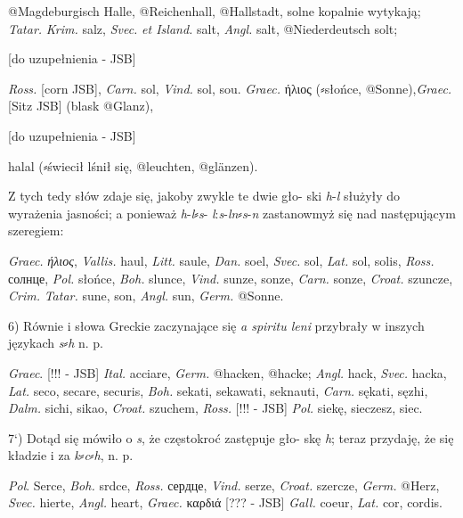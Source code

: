 



@{Magdeburgisch Halle}, @{Reichenhall}, @{Hallstadt}, solne kopalnie wytykają;
\textit{Tatar.} \textit{Krim.} salz, \textit{Svec.} \textit{et Island.} salt, \textit{Angl.} salt, @{Niederdeutsch solt};

[do uzupełnienia - JSB]

\textit{Ross.} [corn JSB], \textit{Carn.} sol, \textit{Vind.} sol, sou.
\textit{Graec.} ήλιος (⸗słońce, @{Sonne}),\textit{Graec.} [Sitz JSB] (blask  @{Glanz}),

[do uzupełnienia - JSB]


halal (⸗świecił lśnił się, @{leuchten}, @{glänzen}).

Z tych tedy słów zdaje się, jakoby zwykle te dwie gło-
ski \textit{h}-\textit{l} służyły do wyrażenia jasności; a ponieważ \textit{h}-\textit{l}⸗\textit{s}-
\textit{l}:\textit{s}-\textit{ln}⸗\textit{s}-\textit{n} zastanowmyż się nad następującym szeregiem:

\textit{Graec.} \textit{ήλιος}, \textit{Vallis.} haul, \textit{Litt.} saule, \textit{Dan.} soel, \textit{Svec.} sol, \textit{Lat.} sol, solis, \textit{Ross.} солнце, \textit{Pol.} słońce, \textit{Boh.} slunce,
\textit{Vind.} sunze, sonze, \textit{Carn.} sonze, \textit{Croat.} szuncze, \textit{Crim.} \textit{Tatar.} sune, son, \textit{Angl.} sun, \textit{Germ.} @{Sonne}.

6) Równie i słowa Greckie zaczynające się  \textit{a spiritu leni}
przybrały w inszych językach  \textit{s⸗h} n. p.

 \textit{Graec}. [!!! - JSB] \textit{Ital.} acciare, \textit{Germ.} @{hacken}, @{hacke}; \textit{Angl.} hack, \textit{Svec.} hacka, \textit{Lat.} seco, secare, securis,
\textit{Boh.} sekati, sekawati, seknauti, \textit{Carn.} sękati, sęzhi, \textit{Dalm.} sichi, sikao, \textit{Croat.} szuchem, \textit{Ross.} [!!! - JSB] \textit{Pol.}
siekę, sieczesz, siec.

7`) Dotąd się mówiło o \textit{s}, że częstokroć zastępuje gło-
skę \textit{h}; teraz przydaję, że się kładzie i za \textit{k⸗c⸗h}, n. p.

\textit{Pol}. Serce, \textit{Boh.} srdce, \textit{Ross.} сердце, \textit{Vind.} serze, \textit{Croat.} szercze, \textit{Germ.} @{Herz}, \textit{Svec.} hierte, \textit{Angl.} heart, \textit{Graec.}
καρδιά [??? - JSB] \textit{Gall.} coeur, \textit{Lat.} cor, cordis.

